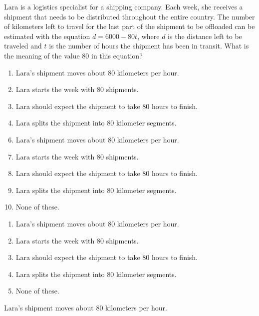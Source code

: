  
Lara is a logistics specialist for a shipping company.  Each week, she receives a shipment that needs to be distributed throughout the entire country.  The number of kilometers left to travel for the last part of the shipment to be offloaded can be estimated  with the equation $d=6000-80t$, where $d$ is the distance left to be traveled and $t$ is the number of hours the shipment has been in transit.  What is the meaning of the value $80$ in this equation?\\


\ifsat
	\begin{enumerate}[label=\Alph*)]
		\item Lara's shipment moves about $80$ kilometers per hour. %
		\item Lara starts the week with $80$ shipments.
		\item Lara should expect the shipment to take $80$ hours to finish.
		\item Lara splits the shipment into $80$ kilometer segments.
	\end{enumerate}
\else
\fi

\ifacteven
	\begin{enumerate}[label=\textbf{\Alph*.},itemsep=\fill,align=left]
		\setcounter{enumii}{5}
		\item Lara's shipment moves about $80$ kilometers per hour. %
		\item Lara starts the week with $80$ shipments.
		\item Lara should expect the shipment to take $80$ hours to finish.
		\addtocounter{enumii}{1}
		\item Lara splits the shipment into $80$ kilometer segments.
		\item None of these. 
	\end{enumerate}
\else
\fi

\ifactodd
	\begin{enumerate}[label=\textbf{\Alph*.},itemsep=\fill,align=left]
		\item Lara's shipment moves about $80$ kilometers per hour. %
		\item Lara starts the week with $80$ shipments.
		\item Lara should expect the shipment to take $80$ hours to finish.
		\item Lara splits the shipment into $80$ kilometer segments.
		\item None of these. 
	\end{enumerate}
\else
\fi

\ifgridin
 Lara's shipment moves about $80$ kilometers per hour. %
		
\else
\fi

